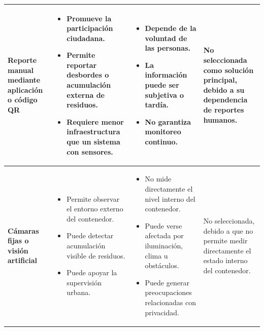 \begin{xltabular}{\linewidth}{
>{\raggedright\arraybackslash}p{2.8cm}
>{\raggedright\arraybackslash}X
>{\raggedright\arraybackslash}X
>{\raggedright\arraybackslash}p{2.7cm}}
\textbf{Reporte manual mediante aplicación o código QR}
&
\begin{itemize}[leftmargin=*, nosep]
    \item Promueve la participación ciudadana.
    \item Permite reportar desbordes o acumulación externa de residuos.
    \item Requiere menor infraestructura que un sistema con sensores.
\end{itemize}
&
\begin{itemize}[leftmargin=*, nosep]
    \item Depende de la voluntad de las personas.
    \item La información puede ser subjetiva o tardía.
    \item No garantiza monitoreo continuo.
\end{itemize}
&
No seleccionada como solución principal, debido a su dependencia de reportes humanos.
\\
\midrule

\textbf{Cámaras fijas o visión artificial}
&
\begin{itemize}[leftmargin=*, nosep]
    \item Permite observar el entorno externo del contenedor.
    \item Puede detectar acumulación visible de residuos.
    \item Puede apoyar la supervisión urbana.
\end{itemize}
&
\begin{itemize}[leftmargin=*, nosep]
    \item No mide directamente el nivel interno del contenedor.
    \item Puede verse afectada por iluminación, clima u obstáculos.
    \item Puede generar preocupaciones relacionadas con privacidad.
\end{itemize}
&
No seleccionada, debido a que no permite medir directamente el estado interno del contenedor.
\\
\midrule


\end{xltabular}
